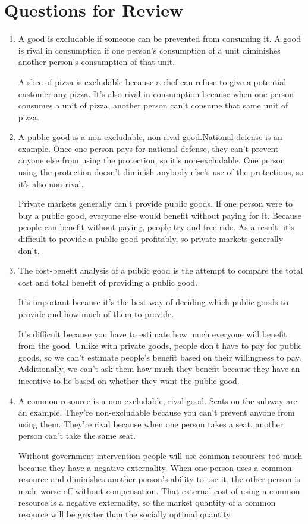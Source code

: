 \documentclass{article}
\begin{document}
\section*{Questions for Review}

\begin{enumerate}

\item A good is excludable if someone can be prevented from consuming it. A good is rival in consumption if one person's consumption of a unit diminishes another person's consumption of that unit.

A slice of pizza is excludable because a chef can refuse to give a potential customer any pizza. It's also rival in consumption because when one person consumes a unit of pizza, another person can't consume that same unit of pizza.   

\item A public good is a non-excludable, non-rival good.National defense is an example. Once one person pays for national defense, they can't prevent anyone else from using the protection, so it's non-excludable. One person using the protection doesn't diminish anybody else's use of the protections, so it's also non-rival.

Private markets generally can't provide public goods. If one person were to buy a public good, everyone else would benefit without paying for it. Because people can benefit without paying, people try and free ride. As a result, it's difficult to provide a public good profitably, so private markets generally don't. 

\item The cost-benefit analysis of a public good is the attempt to compare the total cost and total benefit of providing a public good.

It's important because it's the best way of deciding which public goods to provide and how much of them to provide.

It's difficult because you have to estimate how much everyone will benefit from the good. Unlike with private goods, people don't have to pay for public goods, so we can't estimate people's benefit based on their willingness to pay. Additionally, we can't ask them how much they benefit because they have an incentive to lie based on whether they want the public good.

\item A common resource is a non-excludable, rival good. Seats on the subway are an example. They're non-excludable because you can't prevent anyone from using them. They're rival because when one person takes a seat, another person can't take the same seat. 

Without government intervention people will use common resources too much because they have a negative externality. When one person uses a common resource and diminishes another person's ability to use it, the other person is made worse off without compensation. That external cost of using a common resource is a negative externality, so the market quantity of a common resource will be greater than the socially optimal quantity.

\end{enumerate}
\end{document}
